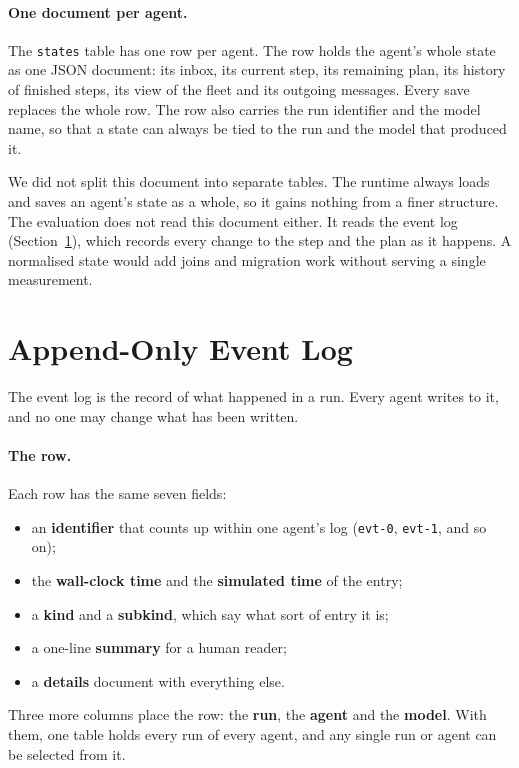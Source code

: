\paragraph{One document per agent.} The \texttt{states} table has one row per
agent. The row holds the agent's whole state as one JSON document: its inbox,
its current step, its remaining plan, its history of finished steps, its view
of the fleet and its outgoing messages. Every save replaces the whole row. The
row also carries the run identifier and the model name, so that a state can
always be tied to the run and the model that produced it.

We did not split this document into separate tables. The runtime always loads
and saves an agent's state as a whole, so it gains nothing from a finer
structure. The evaluation does not read this document either. It reads the
event log (Section~\ref{sec:data:eventlog}), which records every change to the
step and the plan as it happens. A normalised state would add joins and
migration work without serving a single measurement.

\section{Append-Only Event Log}
\label{sec:data:eventlog}

The event log is the record of what happened in a run. Every agent writes to
it, and no one may change what has been written.

\paragraph{The row.} Each row has the same seven fields:
\begin{itemize}
  \item an \textbf{identifier} that counts up within one agent's log
  (\texttt{evt-0}, \texttt{evt-1}, and so on);
  \item the \textbf{wall-clock time} and the \textbf{simulated time} of the
  entry;
  \item a \textbf{kind} and a \textbf{subkind}, which say what sort of entry it
  is;
  \item a one-line \textbf{summary} for a human reader;
  \item a \textbf{details} document with everything else.
\end{itemize}
Three more columns place the row: the \textbf{run}, the \textbf{agent} and the
\textbf{model}. With them, one table holds every run of every agent, and any
single run or agent can be selected from it.

